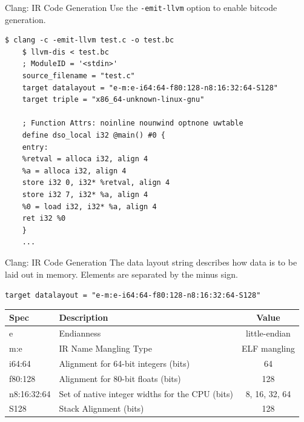 \documentclass{beamer}
\begin{document}
\begin{frame}[fragile]{Clang: IR Code Generation}
    Use the \texttt{-emit-llvm} option to enable bitcode generation.

    \begin{lstlisting}[gobble=4]
    $ clang -c -emit-llvm test.c -o test.bc
    $ llvm-dis < test.bc
    ; ModuleID = '<stdin>'
    source_filename = "test.c"
    target datalayout = "e-m:e-i64:64-f80:128-n8:16:32:64-S128"
    target triple = "x86_64-unknown-linux-gnu"

    ; Function Attrs: noinline nounwind optnone uwtable
    define dso_local i32 @main() #0 {
    entry:
    %retval = alloca i32, align 4
    %a = alloca i32, align 4
    store i32 0, i32* %retval, align 4
    store i32 7, i32* %a, align 4
    %0 = load i32, i32* %a, align 4
    ret i32 %0
    }
    ...
    \end{lstlisting}
\end{frame}

\begin{frame}{Clang: IR Code Generation}
    The data layout string describes how data is to be laid out in memory. Elements are separated by the minus sign.

    \vspace{1em}
    \footnotesize
    \texttt{target datalayout = "e-m:e-i64:64-f80:128-n8:16:32:64-S128"}

    \vspace{1ex}
    \begin{tabular}{l | l c}
        \toprule
        Spec        & Description & Value \\
        \toprule
        e           & Endianness & little-endian \\
        m:e         & IR Name Mangling Type & ELF mangling \\
        i64:64      & Alignment for 64-bit integers (bits) & 64 \\
        f80:128     & Alignment for 80-bit floats (bits)    & 128 \\
        n8:16:32:64 & Set of native integer widths for the CPU (bits) & 8, 16, 32, 64 \\
        S128        & Stack Alignment (bits) & 128 \\
        \bottomrule
    \end{tabular}
\end{frame}

\end{document}
